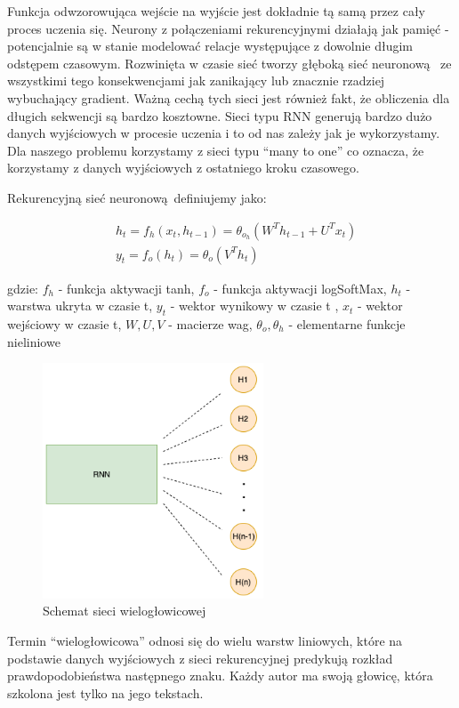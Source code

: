 Funkcja odwzorowująca wejście na wyjście jest dokładnie tą samą przez cały proces
uczenia się. Neurony z połączeniami rekurencyjnymi działają jak pamięć - potencjalnie są w stanie modelować relacje
występujące z dowolnie długim odstępem czasowym. 
Rozwinięta w czasie sieć tworzy głęboką sieć neuronową 
ze wszystkimi tego konsekwencjami jak zanikający lub znacznie rzadziej wybuchający gradient. 
Ważną cechą tych sieci jest również fakt, że obliczenia dla długich sekwencji są bardzo kosztowne.
Sieci typu RNN generują bardzo dużo danych wyjściowych w procesie uczenia i to od nas zależy jak je 
wykorzystamy. Dla naszego problemu korzystamy z sieci typu ``many to one'' co oznacza, że korzystamy
z danych wyjściowych z ostatniego kroku czasowego.

\newpage
Rekurencyjną sieć neuronową definiujemy jako:

\begin{align}
  &h_t = f_h(x_t, h_{t-1}) = \theta_o_h(W^Th_{t-1} + U^Tx_t) \\ 
  &y_t = f_o(h_t) = \theta_o(V^Th_t)
\end{align}

gdzie: \newline
$f_h$ - funkcja aktywacji tanh, \newline
$f_o$ - funkcja aktywacji logSoftMax, \newline
$h_t$ - warstwa ukryta w czasie t, \newline
$y_t$ - wektor wynikowy w czasie t , \newline
$x_t$ - wektor wejściowy w czasie t, \newline
$W, U, V$ - macierze wag, \newline
$\theta_o, \theta_h$ - elementarne funkcje nieliniowe \newline


\begin{figure}[H]
\centering
\includegraphics[height=7cm]{./images/multiheaded-rnn.png}
\caption{Schemat sieci wielogłowicowej}
\label{fig:test5}
\end{figure}

Termin ``wielogłowicowa'' odnosi się do wielu warstw liniowych, które na podstawie danych wyjściowych z 
sieci rekurencyjnej predykują rozkład prawdopodobieństwa następnego znaku. Każdy autor ma swoją głowicę, która 
szkolona jest tylko na jego tekstach.



